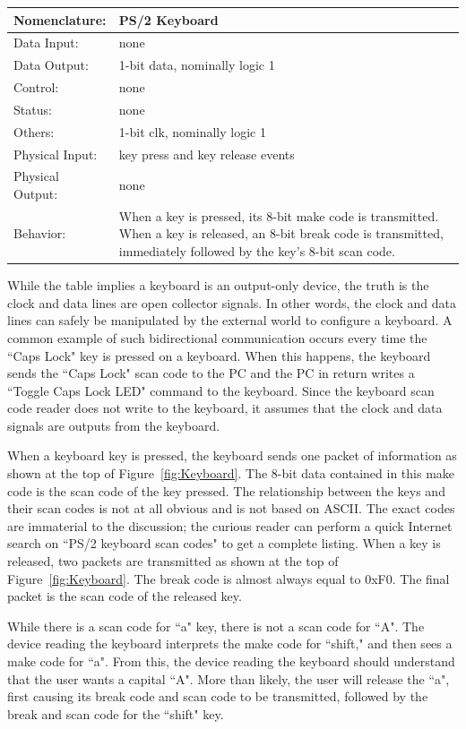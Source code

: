 \begin{tabular}{|l|p{3.5in}|} \hline
Nomenclature:  & PS/2 Keyboard				\\ \hline
Data Input:    & none					\\ \hline
Data Output:   & 1-bit data, nominally logic 1		\\ \hline
Control:       & none					\\ \hline
Status:        & none					\\ \hline
Others:        & 1-bit clk, nominally logic 1		\\ \hline
Physical Input:& key press and key release events 	\\ \hline
Physical Output:& none		\\ \hline
Behavior:      & When a key is pressed, its 8-bit make code
		is transmitted.  When a key is released, an
		8-bit break code is transmitted, immediately
		followed by the key's 8-bit scan code.	\\ \hline
\end{tabular}

While the table implies a keyboard is an output-only device, the
truth is the clock and data lines are open collector signals.  In other words, 
the clock and data lines can safely be manipulated by the 
external world to configure a keyboard.  A common example of such 
bidirectional communication occurs every time the
``Caps Lock" key is pressed on a keyboard.  When this happens, the keyboard 
sends the ``Caps Lock" scan code to the PC and the PC in return writes 
a ``Toggle Caps Lock LED" command to the keyboard.  Since the keyboard 
scan code reader does not write to the keyboard, it assumes that the
clock and data signals are outputs from the keyboard.

When a keyboard key is pressed, the keyboard sends one 
packet of information as shown at the top of Figure~\ref{fig:Keyboard}.
The 8-bit data contained in this make code is the scan code of the 
key pressed.  The relationship between the keys and their scan codes
is not at all obvious and is not based on ASCII. The exact codes are
immaterial to the discussion; the curious reader can perform a quick 
Internet search on ``PS/2 keyboard scan codes" to get a complete listing.
When a key is released, two packets are transmitted as shown at the 
top of Figure~\ref{fig:Keyboard}.  The break code is almost always 
equal to 0xF0.  The final packet is the scan code of the released 
key.  

While there is a scan code for ``a" key, there is not a scan code
for ``A".  The device reading the keyboard interprets the make code
for ``shift," and then sees a make code for ``a".  From this, the device
reading the keyboard should understand that the user wants a capital
``A".  More than likely, the user will release the ``a", first causing 
its break code and scan code to be transmitted, followed by the break
and scan code for the ``shift" key.

